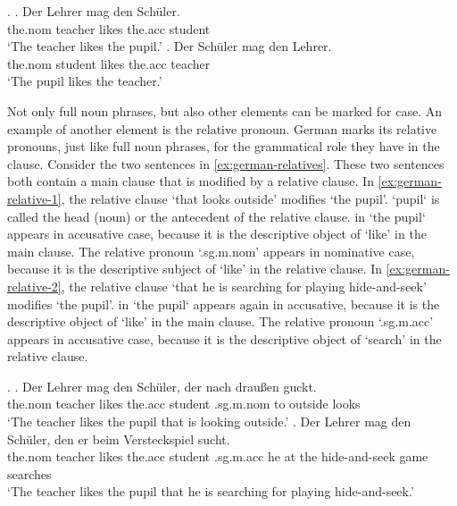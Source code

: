 \ex.\label{ex:german-case}
\ag. Der Lehrer mag den Schüler.\\
 the.\ac{nom} teacher likes the.\ac{acc} student\\
 `The teacher likes the pupil.'\label{ex:german-case-1}
\bg. Der Schüler mag den Lehrer.\\
 the.\ac{nom} student likes the.\ac{acc} teacher\\
 `The pupil likes the teacher.' \label{ex:german-case-2}

Not only full noun phrases, but also other elements can be marked for case. An example of another element is the relative pronoun. German marks its relative pronouns, just like full noun phrases, for the grammatical role they have in the clause. Consider the two sentences in \ref{ex:german-relatives}. These two sentences both contain a main clause that is modified by a relative clause.
In \ref{ex:german-relative-1}, the relative clause  `that looks outside' modifies  `the pupil'.  `pupil` is called the head (noun) or the antecedent of the relative clause.  in  `the pupil` appears in accusative case, because it is the descriptive object of  `like' in the main clause. The relative pronoun  `.\ac{sg}.\ac{m}.\ac{nom}' appears in nominative case, because it is the descriptive subject of  `like' in the relative clause.
In \ref{ex:german-relative-2}, the relative clause  `that he is searching for playing hide-and-seek' modifies  `the pupil'.  in  `the pupil` appears again in accusative, because it is the descriptive object of  `like' in the main clause. The relative pronoun  `.\ac{sg}.\ac{m}.\ac{acc}' appears in accusative case, because it is the descriptive object of  `search' in the relative clause.

\ex.\label{ex:german-relatives}
\ag. Der Lehrer mag den Schüler, der nach draußen guckt.\\
 the.\ac{nom} teacher likes the.\ac{acc} student .\ac{sg}.\ac{m}.\ac{nom} to outside looks\\
 `The teacher likes the pupil that is looking outside.'\label{ex:german-relative-1}
 \bg. Der Lehrer mag den Schüler, den er beim Versteckspiel sucht.\\
 the.\ac{nom} teacher likes the.\ac{acc} student .\ac{sg}.\ac{m}.\ac{acc} he {at the} {hide-and-seek game} searches\\
 `The teacher likes the pupil that he is searching for playing hide-and-seek.' \label{ex:german-relative-2}

